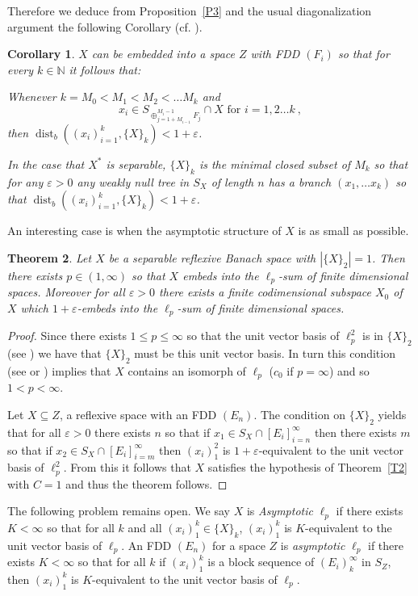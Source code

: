 \documentclass[11pt,leqno]{amsart}
\newtheorem{thm}{Theorem}[section]
\newtheorem{cor}[thm]{Corollary}
\theoremstyle{definition}
\newcommand{\vp}{\varepsilon}
\newcommand{\dist}{\operatorname{dist}}
\newcommand{\N}{\mathbb{N}}
\begin{document}
Therefore we deduce from Proposition~\ref{P3} and 
the usual diagonalization argument the following Corollary 
(cf. \cite{KOS}). 

\begin{cor}\label{C1}
$X$ can be embedded into a space $Z$ with FDD $(F_i)$ so that for 
every $k\in\N$ it follows that:
 
Whenever  $k=M_0<M_1<M_2<\ldots M_k$ and 
$$x_i\in S_{\oplus_{j=1+M_{i-1}}^{M_i-1} F_j}\cap X 
\text{ for }i=1,2\ldots k\ ,$$
then $\dist_b((x_i)_{i=1}^k,\{X\}_k)<1+\vp$.
 
In the case that $X^*$ is separable, $\{X\}_k$ is 
the minimal closed subset of $M_k$ so 
that for any $\vp>0$ any weakly null tree in $S_X$ of 
length $n$ has a branch $(x_1,\ldots x_k)$
so that $\dist_b((x_i)_{i=1}^k,\{X\}_k)<1+\vp$.
\end{cor}

An interesting case is when the asymptotic structure of $X$ is as 
small as possible.

\begin{thm}\label{XsepreflexBS}
Let $X$ be a separable reflexive Banach space with $|\{X\}_2|=1$. 
Then there exists $p\in (1,\infty)$ so that $X$ embeds into the $\ell_p$-sum 
of finite dimensional spaces. 
Moreover for all $\vp>0$ there exists a finite codimensional subspace 
$X_0$ of $X$ which $1+\vp$-embeds into the $\ell_p$-sum of finite 
dimensional spaces. 
\end{thm}

\begin{proof} 
Since there exists $1\le p\le\infty$ so that the unit vector basis of 
$\ell_p^2$ is in $\{X\}_2$ (see \cite{MMT}) we have that $\{X\}_2$ must 
be this unit vector basis. 
In turn this condition (see \cite{MMT} or \cite{KOS}) implies that $X$ 
contains an isomorph of $\ell_p$ ($c_0$ if $p=\infty$) and so $1<p<\infty$. 

Let $X\subseteq Z$, a reflexive space with an FDD $(E_n)$. 
The condition on $\{X\}_2$ yields that for all $\vp>0$ there exists $n$ 
so that if $x_1 \in S_X\cap [E_i]_{i=n}^\infty$ then there exists $m$ 
so that if $x_2\in S_X \cap [E_i]_{i=m}^\infty$ then $(x_i)_1^2$ is 
$1+\vp$-equivalent to the unit vector basis of $\ell_p^2$. 
{From} this it follows that $X$ satisfies the hypothesis of 
Theorem~\ref{T2} with $C=1$ and thus the theorem follows.
\end{proof}

The following problem remains open. 
We say $X$ is {\em Asymptotic\/} $\ell_p$ if there exists $K<\infty$ so that 
for all $k$ and all $(x_i)_1^k \in \{X\}_k$, $(x_i)_1^k$ is $K$-equivalent 
to the unit vector basis of $\ell_p$. 
An FDD $(E_n)$ for a space $Z$ is {\em asymptotic\/} $\ell_p$ if there 
exists $K<\infty$ so that for all $k$ if $(x_i)_1^k$ is a block sequence 
of $(E_i)_k^\infty$ in $S_Z$, then $(x_i)_1^k$ is $K$-equivalent to the 
unit vector basis of $\ell_p$. 
\end{document}

